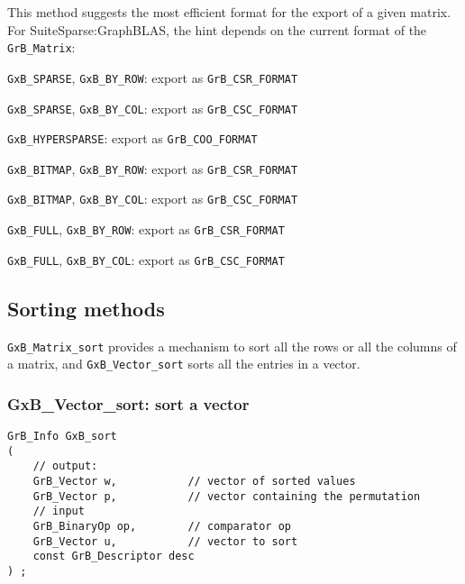 \documentclass[12pt]{article}
\newenvironment{packed_itemize}{
\begin{itemize}
  \setlength{\itemsep}{1pt}
  \setlength{\parskip}{0pt}
  \setlength{\parsep}{0pt}
}{\end{itemize}}
\begin{document}
{This method suggests the most efficient format for the export of a given
matrix.  For SuiteSparse:GraphBLAS, the hint depends on the current
format of the \verb'GrB_Matrix':

\begin{packed_itemize}
\item \verb'GxB_SPARSE', \verb'GxB_BY_ROW': export as \verb'GrB_CSR_FORMAT'
\item \verb'GxB_SPARSE', \verb'GxB_BY_COL': export as \verb'GrB_CSC_FORMAT'
\item \verb'GxB_HYPERSPARSE': export as \verb'GrB_COO_FORMAT'
\item \verb'GxB_BITMAP', \verb'GxB_BY_ROW': export as \verb'GrB_CSR_FORMAT'
\item \verb'GxB_BITMAP', \verb'GxB_BY_COL': export as \verb'GrB_CSC_FORMAT'
\item \verb'GxB_FULL', \verb'GxB_BY_ROW': export as \verb'GrB_CSR_FORMAT'
\item \verb'GxB_FULL', \verb'GxB_BY_COL': export as \verb'GrB_CSC_FORMAT'
\end{packed_itemize}

\newpage
\subsection{Sorting methods}
\label{sorting_methods}

\verb'GxB_Matrix_sort' provides a mechanism to sort all the rows or
all the columns of a matrix, and \verb'GxB_Vector_sort' sorts all the
entries in a vector.

\subsubsection{{\sf GxB\_Vector\_sort:} sort a vector}
\label{vector_sort}

\begin{mdframed}[userdefinedwidth=6in]
{\footnotesize
\begin{verbatim}
GrB_Info GxB_sort
(
    // output:
    GrB_Vector w,           // vector of sorted values
    GrB_Vector p,           // vector containing the permutation
    // input
    GrB_BinaryOp op,        // comparator op
    GrB_Vector u,           // vector to sort
    const GrB_Descriptor desc
) ;
\end{verbatim}
} \end{mdframed}

}
\end{document}
